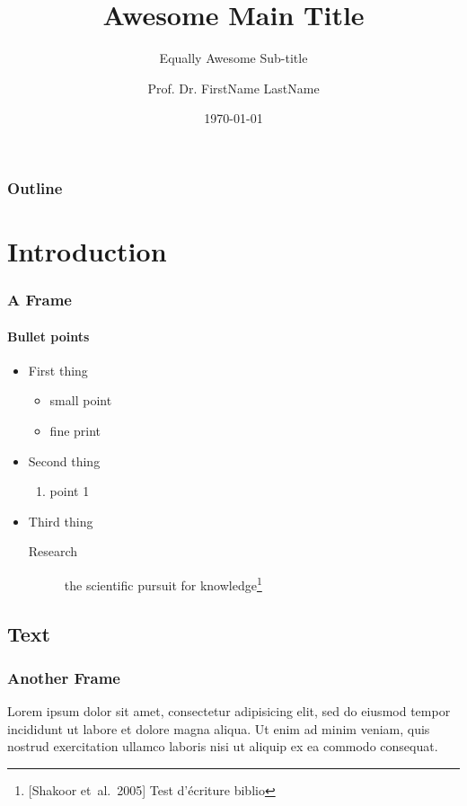 \documentclass[smaller]{beamer}
\title[Event Name or Short Title]{Awesome Main Title}
\subtitle{Equally Awesome Sub-title}
\author[Short author name]{Prof. Dr. FirstName LastName}
\date{\today}
\begin{document}
\begin{frame}[plain]
    \titlepage
\end{frame}

\begin{frame}%
    \frametitle{Outline}
    \tableofcontents
\end{frame}


\section{Introduction}
\begin{frame}
    \frametitle{A Frame}
    \framesubtitle{Bullet points}
    \begin{itemize}
        \item First thing
            \begin{itemize}
                \item small point
                \item fine print
            \end{itemize}
        \item Second thing
            \begin{enumerate}
                \item point 1
            \end{enumerate}
        \item Third thing
            \begin{description}
                \item[Research] the scientific pursuit for knowledge\footnote{[Shakoor et\ al.\ 2005] Test d'écriture biblio}
            \end{description}
    \end{itemize}
\end{frame}

\subsection{Text}
\begin{frame}
    \frametitle{Another Frame}
    Lorem ipsum dolor sit amet, consectetur adipisicing elit, sed do eiusmod tempor incididunt ut labore et dolore magna aliqua. Ut enim ad minim veniam, quis nostrud exercitation ullamco laboris nisi ut aliquip ex ea commodo consequat.
\end{frame}
\end{document}
